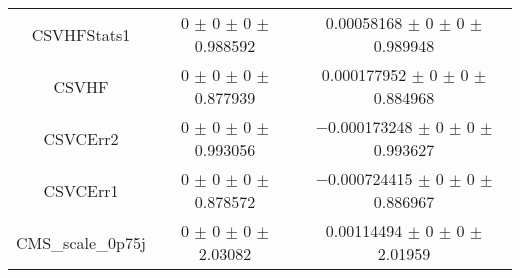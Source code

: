 \begin{table}
\begin{tabular}{ccc}
CSVHFStats1 	& \num{0} $\pm$ \num{0} $\pm$ \num{0} $\pm$ \num{0.988592} 	& \num{0.00058168} $\pm$ \num{0} $\pm$ \num{0} $\pm$ \num{0.989948}\\
CSVHF 	& \num{0} $\pm$ \num{0} $\pm$ \num{0} $\pm$ \num{0.877939} 	& \num{0.000177952} $\pm$ \num{0} $\pm$ \num{0} $\pm$ \num{0.884968}\\
CSVCErr2 	& \num{0} $\pm$ \num{0} $\pm$ \num{0} $\pm$ \num{0.993056} 	& \num{-0.000173248} $\pm$ \num{0} $\pm$ \num{0} $\pm$ \num{0.993627}\\
CSVCErr1 	& \num{0} $\pm$ \num{0} $\pm$ \num{0} $\pm$ \num{0.878572} 	& \num{-0.000724415} $\pm$ \num{0} $\pm$ \num{0} $\pm$ \num{0.886967}\\
CMS\_scale\_0p75j 	& \num{0} $\pm$ \num{0} $\pm$ \num{0} $\pm$ \num{2.03082} 	& \num{0.00114494} $\pm$ \num{0} $\pm$ \num{0} $\pm$ \num{2.01959}\\
\bottomrule
\end{tabular}
\end{table}